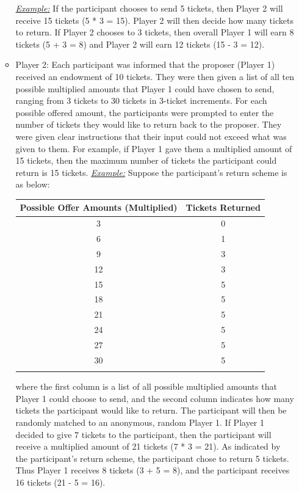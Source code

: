 \documentclass[12pt]{article}
\begin{document}
\begin{itemize}
\begin{itemize}
		\subitem \underline{\textit{Example:}} If the participant chooses to send 5 tickets, then Player 2 will receive 15 tickets (5 * 3 = 15). Player 2 will then decide how many tickets to return. If Player 2 chooses to 3 tickets, then overall Player 1 will earn 8 tickets (5 + 3 = 8) and Player 2 will earn 12 tickets (15 - 3 = 12).
		\item{Player 2}: Each participant was informed that the proposer (Player 1) received an endowment of 10 tickets. They were then given a list of all ten possible multiplied amounts that Player 1 could have chosen to send, ranging from 3 tickets to 30 tickets in 3-ticket increments. For each possible offered amount, the participants were prompted to enter the number of tickets they would like to return back to the proposer. They were given clear instructions that their input could not exceed what was given to them. For example, if Player 1 gave them a multiplied amount of 15 tickets, then the maximum number of tickets the participant could return is 15 tickets.
		\subitem \underline{\textit{Example:}} Suppose the participant\rq s return scheme is as below: \\
		
\begin{center}
\begin{tabular}{ c c }
\hline \hline
 Possible Offer Amounts (Multiplied) & Tickets Returned \\ 
 \hline
3 & 0  \\  
6 & 1 \\  
9 & 3  \\  
12 & 3  \\  
15 & 5   \\  
18 & 5  \\  
21 & 5 \\  
24 & 5 \\  
27 & 5 \\  
30 & 5 \\  
\hline \hline \\
\end{tabular}
\end{center} 

	where the first column is a list of all possible multiplied amounts that Player 1 could choose to send, and the second column indicates how many tickets the participant would like to return. The participant will then be randomly matched to an anonymous, random Player 1. If Player 1 decided to give 7 tickets to the participant, then the participant will receive a multiplied amount of 21 tickets (7 * 3 = 21). As indicated by the participant\rq s return scheme, the participant chose to return 5 tickets. Thus Player 1 receives 8 tickets (3 + 5 =  8), and the participant receives 16 tickets (21 - 5 = 16).
	\end{itemize}
	

\end{itemize}
\end{document}
